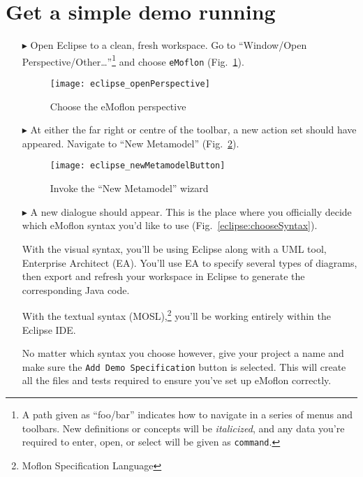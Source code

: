\newpage
\genHeader

\section{Get a simple demo running}


\begin{itemize}
\hypertarget{simpleDemo common}{} 
\item[$\blacktriangleright$] Open Eclipse to a clean, fresh workspace. Go to ``Window/Open Perspective/Other\ldots''\footnote{A path given as ``foo/bar''
indicates how to navigate in a series of menus and toolbars. New definitions or concepts will be \emph{italicized}, and any data you're required to enter,
open, or select will be given as \texttt{command}.} and choose \texttt{eMoflon} (Fig.~\ref{eclipse:openPerspective}).

\begin{figure}[htbp]
	\centering
  \texttt{[image: eclipse\_openPerspective]}
	\caption{Choose the eMoflon perspective}
	\label{eclipse:openPerspective}
\end{figure} 

\item[$\blacktriangleright$] At either the far right or centre of the toolbar, a new action set should have appeared. Navigate to ``New Metamodel''
(Fig.~\ref{eclipse:newMetamodel}).

\vspace{0.5cm}
\begin{figure}[htbp]
	\centering
  \texttt{[image: eclipse\_newMetamodelButton]}
	\caption{Invoke the ``New Metamodel'' wizard}
	\label{eclipse:newMetamodel}
\end{figure}

\newpage

\item[$\blacktriangleright$] A new dialogue should appear. This is the place where you officially decide which eMoflon syntax you'd like to use
(Fig.~\ref{eclipse:chooseSyntax}).

With the visual syntax, you'll be using Eclipse along with a UML tool, Enterprise Architect (EA). You'll use EA to specify
several types of diagrams, then export and refresh your workspace in Eclipse to generate the corresponding Java code.

With the textual syntax (MOSL),\footnote{Moflon Specification Language} you'll be working entirely within the Eclipse IDE.

No matter which syntax you choose however, give your project
a name and make sure the \texttt{Add Demo Specification} button is selected. This will create all the files and tests required to ensure you've set up eMoflon
correctly.


\end{itemize}
